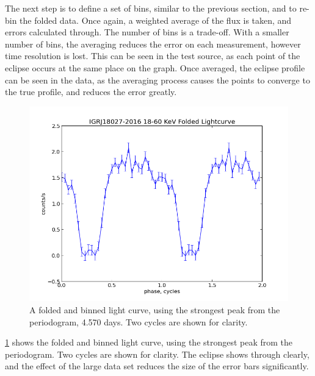 The next step is to define a set of bins, similar to the previous section, and to re-bin the folded data. Once again, a weighted average of the flux is taken, and errors calculated through. The number of bins is a trade-off. With a smaller number of bins, the averaging reduces the error on each measurement, however time resolution is lost. This can be seen in the test source, as each point of the eclipse occurs at the same place on the graph. Once averaged, the eclipse profile can be seen in the data, as the averaging process causes the points to converge to the true profile, and reduces the error greatly. 

\begin{figure}[h!]
\centering
\includegraphics[width=130mm]{gfx/Fig5.png}
\caption{A folded and binned light curve, using the strongest peak from the periodogram, 4.570 days. Two cycles are shown for clarity.}
\label{Figure 5}
\end{figure}

\ref{Figure 5} shows the folded and binned light curve, using the strongest peak from the periodogram. Two cycles are shown for clarity. The eclipse shows through clearly, and the effect of the large data set reduces the size of the error bars significantly.

